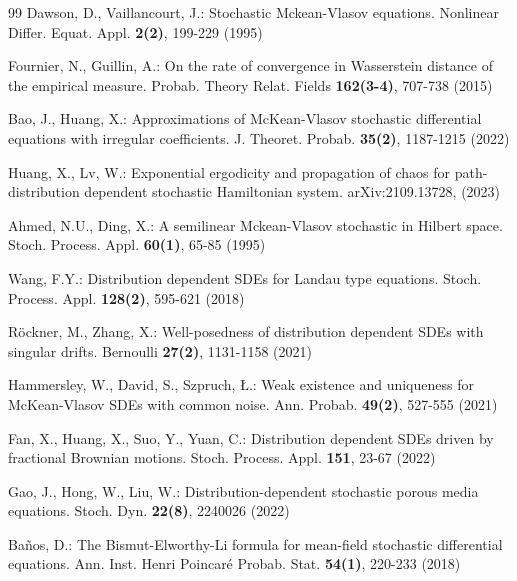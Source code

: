 \documentclass[11pt]{article}
\numberwithin{equation}{section}
\theoremstyle{plain}
\begin{document}
\begin{thebibliography}{99}
  Dawson, D.,  Vaillancourt, J.:
  Stochastic Mckean-Vlasov equations.
  Nonlinear Differ. Equat. Appl. {\bf 2(2)}, 199-229 (1995)

  Fournier, N.,  Guillin, A.:
  On the rate of convergence in Wasserstein distance of the empirical measure.
  Probab. Theory Relat. Fields {\bf 162(3-4)}, 707-738 (2015)

   Bao, J.,  Huang, X.:
   Approximations of McKean-Vlasov stochastic differential equations with irregular coefficients.
   J. Theoret. Probab. {\bf 35(2)}, 1187-1215 (2022)

  Huang, X.,  Lv, W.:
  Exponential ergodicity and propagation of chaos for path-distribution dependent stochastic Hamiltonian system.
  arXiv:2109.13728, (2023)




  Ahmed, N.U., Ding, X.:
  A semilinear Mckean-Vlasov stochastic in Hilbert space.
  Stoch. Process. Appl. {\bf 60(1)}, 65-85 (1995)

  Wang, F.Y.:
  Distribution dependent SDEs for Landau type equations.
  Stoch. Process. Appl. {\bf 128(2)}, 595-621 (2018)

  R\"{o}ckner, M.,  Zhang, X.:
  Well-posedness of distribution dependent SDEs with singular drifts.
  Bernoulli {\bf 27(2)}, 1131-1158 (2021)

  Hammersley, W.,  David, S.,  Szpruch, {\L}.:
  Weak existence and uniqueness for McKean-Vlasov SDEs with common noise.
  Ann. Probab. {\bf 49(2)}, 527-555 (2021)

  Fan, X.,  Huang, X.,  Suo, Y.,  Yuan, C.:
  Distribution dependent SDEs driven by fractional Brownian motions.
  Stoch. Process. Appl. {\bf 151}, 23-67 (2022)

  Gao, J.,  Hong, W.,  Liu, W.:
  Distribution-dependent stochastic porous media equations.
  Stoch. Dyn. {\bf 22(8)}, 2240026 (2022)




  Ba\~{n}os, D.:
  The Bismut-Elworthy-Li formula for mean-field stochastic differential equations.
  Ann. Inst. Henri Poincar\'{e} Probab. Stat. {\bf 54(1)}, 220-233 (2018)


\end{thebibliography}
\end{document}
